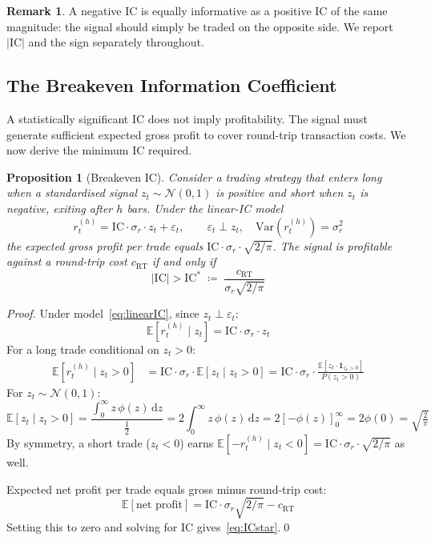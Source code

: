 \documentclass[12pt, a4paper]{article}
\theoremstyle{plain}
\newtheorem{proposition}{Proposition}[section]
\theoremstyle{definition}
\newtheorem{remark}{Remark}[section]
\newcommand{\IC}{\mathrm{IC}}
\newcommand{\E}{\mathbb{E}}
\newcommand{\Var}{\mathrm{Var}}
\begin{document}
\begin{remark}
  A negative IC is equally informative as a positive IC of the same
  magnitude: the signal should simply be traded on the opposite side.
  We report $|\IC|$ and the sign separately throughout.
\end{remark}

\subsection{The Breakeven Information Coefficient}
\label{sec:ICstar}

A statistically significant IC does not imply profitability.  The signal must
generate sufficient expected gross profit to cover round-trip transaction costs.
We now derive the minimum IC required.

\begin{proposition}[Breakeven IC]
  \label{prop:ICstar}
  Consider a trading strategy that enters long when a standardised signal
  $z_t \sim \mathcal{N}(0,1)$ is positive and short when $z_t$ is negative,
  exiting after $h$ bars.  Under the linear-IC model
  \begin{equation}
    r_t^{(h)} = \IC \cdot \sigma_r \cdot z_t + \varepsilon_t, \qquad
    \varepsilon_t \perp z_t,\quad
    \Var(r_t^{(h)}) = \sigma_r^2
    \label{eq:linearIC}
  \end{equation}
  the expected gross profit per trade equals
  $\IC \cdot \sigma_r \cdot \sqrt{2/\pi}$.  The signal is profitable
  against a round-trip cost $c_{\mathrm{RT}}$ if and only if
  \begin{equation}
    |\IC| > \IC^* \;\coloneqq\; \frac{c_{\mathrm{RT}}}{\sigma_r \sqrt{2/\pi}}
    \label{eq:ICstar}
  \end{equation}
\end{proposition}

\begin{proof}
  Under model~\eqref{eq:linearIC}, since $z_t \perp \varepsilon_t$:
  \[
    \E[r_t^{(h)} \mid z_t] = \IC \cdot \sigma_r \cdot z_t
  \]
  For a long trade conditional on $z_t > 0$:
  \begin{align*}
    \E[r_t^{(h)} \mid z_t > 0]
    &= \IC \cdot \sigma_r \cdot \E[z_t \mid z_t > 0]
    = \IC \cdot \sigma_r \cdot \frac{\E[z_t \cdot \mathbf{1}_{z_t > 0}]}
                                     {P(z_t > 0)}
  \end{align*}
  For $z_t \sim \mathcal{N}(0,1)$:
  \[
    \E[z_t \mid z_t > 0]
    = \frac{\int_0^\infty z\,\phi(z)\,\mathrm{d}z}{\tfrac{1}{2}}
    = 2\int_0^\infty z\,\phi(z)\,\mathrm{d}z
    = 2\left[-\phi(z)\right]_0^\infty
    = 2\phi(0)
    = \sqrt{\tfrac{2}{\pi}}
  \]
  By symmetry, a short trade ($z_t < 0$) earns $\E[-r_t^{(h)} \mid z_t < 0]
  = \IC \cdot \sigma_r \cdot \sqrt{2/\pi}$ as well.

  Expected net profit per trade equals gross minus round-trip cost:
  \[
    \E[\text{net profit}] = \IC \cdot \sigma_r \sqrt{2/\pi} - c_{\mathrm{RT}}
  \]
  Setting this to zero and solving for IC gives~\eqref{eq:ICstar}.\qed
\end{proof}
\end{document}
